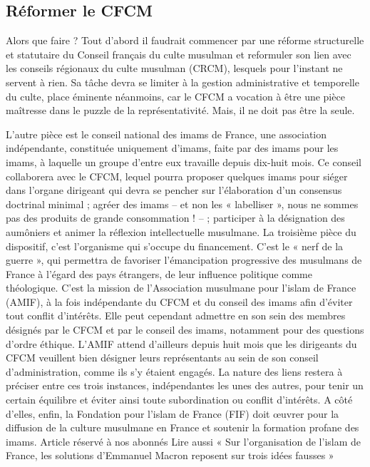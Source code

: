\subsection*{Réformer le CFCM}
Alors que faire ? Tout d’abord il faudrait commencer par une réforme structurelle et statutaire du Conseil français du culte musulman et reformuler son lien avec les conseils régionaux du culte musulman (CRCM), lesquels pour l’instant ne servent à rien. Sa tâche devra se limiter à la gestion administrative et temporelle du culte, place éminente néanmoins, car le CFCM a vocation à être une pièce maîtresse dans le puzzle de la représentativité. Mais, il ne doit pas être la seule.
 
L’autre pièce est le conseil national des imams de France, une association indépendante, constituée uniquement d’imams, faite par des imams pour les imams, à laquelle un groupe d’entre eux travaille depuis dix-huit mois. Ce conseil collaborera avec le CFCM, lequel pourra proposer quelques imams pour siéger dans l’organe dirigeant qui devra se pencher sur l’élaboration d’un consensus doctrinal minimal ; agréer des imams – et non les « labelliser », nous ne sommes pas des produits de grande consommation ! – ; participer à la désignation des aumôniers et animer la réflexion intellectuelle musulmane.
La troisième pièce du dispositif, c’est l’organisme qui s’occupe du financement. C’est le « nerf de la guerre », qui permettra de favoriser l’émancipation progressive des musulmans de France à l’égard des pays étrangers, de leur influence politique comme théologique. C’est la mission de l’Association musulmane pour l’islam de France (AMIF), à la fois indépendante du CFCM et du conseil des imams afin d’éviter tout conflit d’intérêts. Elle peut cependant admettre en son sein des membres désignés par le CFCM et par le conseil des imams, notamment pour des questions d’ordre éthique. L’AMIF attend d’ailleurs depuis huit mois que les dirigeants du CFCM veuillent bien désigner leurs représentants au sein de son conseil d’administration, comme ils s’y étaient engagés. La nature des liens restera à préciser entre ces trois instances, indépendantes les unes des autres, pour tenir un certain équilibre et éviter ainsi toute subordination ou conflit d’intérêts. A côté d’elles, enfin, la Fondation pour l’islam de France (FIF) doit œuvrer pour la diffusion de la culture musulmane en France et soutenir la formation profane des imams.
Article réservé à nos abonnés Lire aussi « Sur l’organisation de l’islam de France, les solutions d’Emmanuel Macron reposent sur trois idées fausses » 
